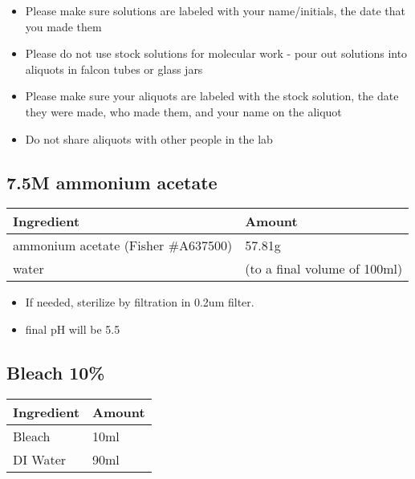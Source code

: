 \documentclass[
  letterpaper,
  DIV=11,
  numbers=noendperiod]{scrreprt}
\begin{document}

\begin{itemize}
\item
  Please make sure solutions are labeled with your name/initials, the
  date that you made them
\item
  Please do not use stock solutions for molecular work - pour out
  solutions into aliquots in falcon tubes or glass jars
\item
  Please make sure your aliquots are labeled with the stock solution,
  the date they were made, who made them, and your name on the aliquot
\item
  Do not share aliquots with other people in the lab
\end{itemize}

\hypertarget{m-ammonium-acetate}{%
\subsection*{\texorpdfstring{\textbf{7.5M ammonium
acetate}}{7.5M ammonium acetate}}\label{m-ammonium-acetate}}

\begin{longtable}[]{@{}ll@{}}
\toprule()
\textbf{Ingredient} & \textbf{Amount} \\
\midrule()
\endhead
ammonium acetate (Fisher \#A637500) & 57.81g \\
water & (to a final volume of 100ml) \\
\bottomrule()
\end{longtable}

\begin{itemize}
\item
  If needed, sterilize by filtration in 0.2um filter.
\item
  final pH will be 5.5
\end{itemize}

\hypertarget{bleach-10}{%
\subsection*{\texorpdfstring{\textbf{Bleach
10\%}}{Bleach 10\%}}\label{bleach-10}}

\begin{longtable}[]{@{}ll@{}}
\toprule()
\textbf{Ingredient} & \textbf{Amount} \\
\midrule()
\endhead
Bleach & 10ml \\
DI Water & 90ml \\
\bottomrule()
\end{longtable}
\end{document}
